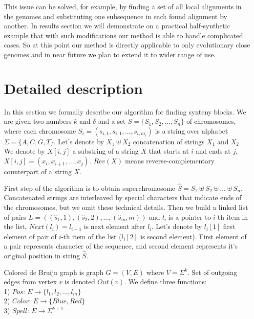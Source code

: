 \documentclass[a4paper,12pt]{scrartcl}
\begin{document}
This issue can be solved, for example, by finding a set of all local alignments in the genomes and substituting one subsequence in each found alignment
by another. In results section we will demonstrate on a practical half-synthetic example that with such modifications our method is able to handle
complicated cases. So at this point our method is directly applicable to only evolutionary close genomes and  in near future we plan to extend it to
wider range of use.

\section{Detailed description}

In this section we formally describe our algorithm for finding synteny blocks. We are given two numbers \(k\) and \(\delta\) and a
set \(S = \lbrace S_{1}, S_{2}, \ldots, S_{n} \rbrace \) of chromosomes,
where each chromosome  \(S_{i} = (s_{i, 1}, s_{i, 1}, \ldots, s_{i, m_i})\) is a string over alphabet \(\Sigma = \lbrace A, C, G, T \rbrace\).
Let's denote by \(X_{1} \uplus X_{2}\) concatenation of strings \(X_{1}\) and \(X_{2}\). We denote by \(X[i, j]\) a substring of a string \(X\) that
starts at \(i\) and ends at \(j\), \(X[i, j] = (x_{i}, x_{i + 1}, \ldots, x_{j}) \). \(Rev(X)\) means reverse-complementary counterpart of a string \(X\).

First step of the algorithm is to obtain superchromosome \(\hat{S} = S_{1} \uplus S_{2} \uplus \ldots \uplus S_{n} \). Concatenated
strings are interleaved by special characters that indicate ends of the chromosomes, but we omit these technical details. Then we build a linked list of
pairs \(L = ((\hat{s}_1, 1), (\hat{s}_2, 2), \ldots, (\hat{s}_{m}, m))\) and \(l_i\) is a pointer to \(i\)-th item in the list, \(Next(l_i) = l_{i + 1}\) is next
element after \(l_i\). Let's denote by \(l_i[1]\) first element of pair of \(i\)-th item of the list (\(l_i[2]\) is second element). First element of a pair represents
character of the sequence, and second element represents it's original position in string \(\hat{S}\). 

Colored de Bruijn graph is graph \(G = (V, E) \) where \(V = \Sigma ^ k \). Set of outgoing edges from vertex \(v\) is denoted \(Out(v)\). We define three functions: \\
1) \(Pos : \, E \rightarrow \lbrace l_1, l_2, \ldots , l_m \rbrace \) \\
2) \(Color : \, E \rightarrow \lbrace Blue, Red \rbrace \) \\
3) \(Spell: \, E \rightarrow \Sigma ^ {k + 1} \)
\end{document}
